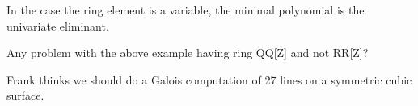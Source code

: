 In the case the ring element is a variable, the minimal polynomial is the univariate eliminant.
%
\begin{leftbar}

\end{leftbar}
%


%

{\color{red} Any problem with the above example having ring QQ[Z] and not RR[Z]?}

{\color{red} Frank thinks we should do a Galois computation of 27 lines on a symmetric cubic surface.}

